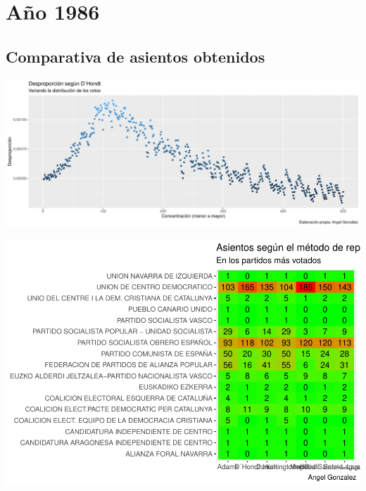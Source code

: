 \documentclass[12pt,a4paper,]{book}
\numberwithin{dummy}{section}
\theoremstyle{ocrenumbox}
\theoremstyle{blacknumex}
\theoremstyle{blacknumbox}
\theoremstyle{ocrenum}
\theoremstyle{ocrenum}
\begin{document}
\hypertarget{auxf1o-1986}{%
\section{Año 1986}\label{auxf1o-1986}}

\hypertarget{comparativa-de-asientos-obtenidos-3}{%
\subsection{Comparativa de asientos
obtenidos}\label{comparativa-de-asientos-obtenidos-3}}

\begin{center}\includegraphics[width=1\linewidth]{figurasR/unnamed-chunk-14-1} \end{center}

\begin{center}\includegraphics[width=1\linewidth]{figurasR/unnamed-chunk-14-2} \end{center}
\end{document}
